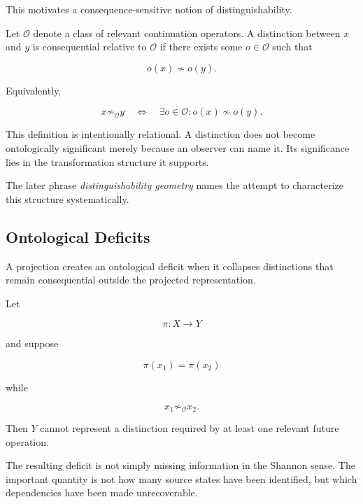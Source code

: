 \documentclass[11pt]{article}
\theoremstyle{remark}
\begin{document}
This motivates a consequence-sensitive notion of distinguishability.

Let $\mathcal{O}$ denote a class of relevant continuation operators. A distinction between $x$ and $y$ is consequential relative to $\mathcal{O}$ if there exists some $o\in\mathcal{O}$ such that

\begin{equation}
o(x)\not\sim o(y).
\end{equation}

Equivalently,

\begin{equation}
x\not\sim_{\mathcal{O}}y
\quad\Longleftrightarrow\quad
\exists o\in\mathcal{O}
:
o(x)\not\sim o(y).
\end{equation}

This definition is intentionally relational. A distinction does not become ontologically significant merely because an observer can name it. Its significance lies in the transformation structure it supports.

The later phrase \emph{distinguishability geometry} names the attempt to characterize this structure systematically.

\subsection{Ontological Deficits}

A projection creates an ontological deficit when it collapses distinctions that remain consequential outside the projected representation.

Let

\begin{equation}
\pi:X\rightarrow Y
\end{equation}

and suppose

\begin{equation}
\pi(x_1)=\pi(x_2)
\end{equation}

while

\begin{equation}
x_1\not\sim_{\mathcal{O}}x_2.
\end{equation}

Then $Y$ cannot represent a distinction required by at least one relevant future operation.

The resulting deficit is not simply missing information in the Shannon sense. The important quantity is not how many source states have been identified, but which dependencies have been made unrecoverable.
\end{document}
